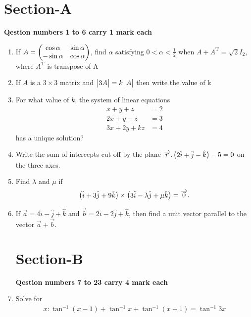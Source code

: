 \documentclass[journal,12pt,twocolumn]{IEEEtran}
\renewcommand\thesection{\arabic{section}}
\begin{document}
\section{Section-A}
\textbf{Qestion numbers 1 to 6 carry 1 mark each}\\
\renewcommand{\theequation}{\theenumi}
\begin{enumerate}[label=\thesection.\arabic*.,ref=\thesection.\theenumi]
\item If $A = \begin{pmatrix}\cos \alpha & \sin \alpha\\ -\sin \alpha & \cos \alpha\end{pmatrix}$, find $\alpha$ satisfying $0<\alpha<\frac{1}{2}$ when $A + A^{\text{T}} = \sqrt{2}I_{2}$, where $A^{\text{T}}$ is transpose of A

\item If $A$ is a $3\times3$ matrix and $\begin{vmatrix}3A\end{vmatrix} = k \begin{vmatrix}A\end{vmatrix}$ then write the value of k

\item For what value of $k$, the system of linear equations 
	\begin{align}
		x+y+z &= 2\\
		2x+y-z &=3\\
		3x+2y+kz &=4
	\end{align}
	has a unique solution? 

\item Write the sum of intercepts cut off by the plane $\overrightarrow{r}.\begin{pmatrix}2\hat{i}+\hat{j}-\hat{k}\end{pmatrix} - 5 = 0$ on the three axes.

\item Find $\lambda$ and $\mu$ if
	\begin{align}
		\begin{pmatrix}\hat{i} + 3\hat{j} + 9\hat{k}\end{pmatrix} \times \begin{pmatrix}3\hat{i} - \lambda \hat{j} + \mu \hat{k}\end{pmatrix} = \overrightarrow{0}.
	\end{align}

\item If $\overrightarrow{a} = 4\hat{i} - \hat{j} +\hat{k}$ and $\overrightarrow{b} = 2\hat{i} - 2\hat{j} + \hat{k}$, then find a unit vector parallel to the vector $\overrightarrow{a}+\overrightarrow{b}$.

\section{Section-B}
\textbf{Qestion numbers 7 to 23 carry 4 mark each}\\
\item Solve for 
	\begin{align}
		x: \tan^{-1}(x-1) + \tan^{-1}x + \tan^{-1}(x+1) = \tan^{-1}3x
	\end{align}


\end{enumerate}
\end{document}
